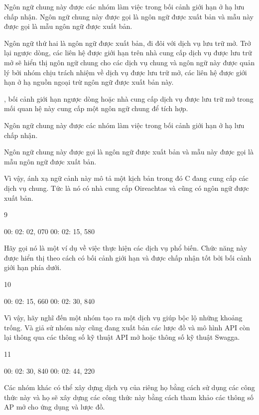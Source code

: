 Ngôn ngữ chung này được các nhóm làm việc trong bối cảnh giới hạn ở hạ lưu chấp nhận. Ngôn ngữ chung này được gọi là ngôn ngữ được xuất bản và mẫu này được gọi là mẫu ngôn ngữ được xuất bản.


Ngôn ngữ thứ hai là ngôn ngữ được xuất bản, đi đôi với dịch vụ lưu trữ mở. Trở lại ngược dòng, các liên hệ được giới hạn trên nhà cung cấp dịch vụ được lưu trữ mở sẽ hiển thị ngôn ngữ chung cho các dịch vụ chung và ngôn ngữ này được quản lý bởi nhóm chịu trách nhiệm về dịch vụ được lưu trữ mở, các liên hệ được giới hạn ở hạ nguồn ngoại trừ ngôn ngữ được xuất bản này.


, bối cảnh giới hạn ngược dòng hoặc nhà cung cấp dịch vụ được lưu trữ mở trong mối quan hệ này cung cấp một ngôn ngữ chung để tích hợp.

Ngôn ngữ chung này được các nhóm làm việc trong bối cảnh giới hạn ở hạ lưu chấp nhận.

Ngôn ngữ chung này được gọi là ngôn ngữ được xuất bản và mẫu này được gọi là mẫu ngôn ngữ được xuất bản.


Vì vậy, ánh xạ ngữ cảnh này mô tả một kịch bản trong đó C đang cung cấp các dịch vụ chung. Tức là nó có nhà cung cấp Oireachtas và cũng có ngôn ngữ được xuất bản.

9

00: 02: 02, 070 00: 02: 15, 580

Hãy gọi nó là một ví dụ về việc thực hiện các dịch vụ phổ biến. Chức năng này được hiển thị theo cách có bối cảnh giới hạn và được chấp nhận tốt bởi bối cảnh giới hạn phía dưới.

10

00: 02: 15, 660 00: 02: 30, 840

Vì vậy, hãy nghĩ đến một nhóm tạo ra một dịch vụ giúp bộc lộ những khoảng trống. Và giả sử nhóm này cũng đang xuất bản các lược đồ và mô hình API còn lại thông qua các thông số kỹ thuật API mở hoặc thông số kỹ thuật Swagga.

11

00: 02: 30, 840 00: 02: 44, 220

Các nhóm khác có thể xây dựng dịch vụ của riêng họ bằng cách sử dụng các công thức này và họ sẽ xây dựng các công thức này bằng cách tham khảo các thông số AP mở cho ứng dụng và lược đồ.


